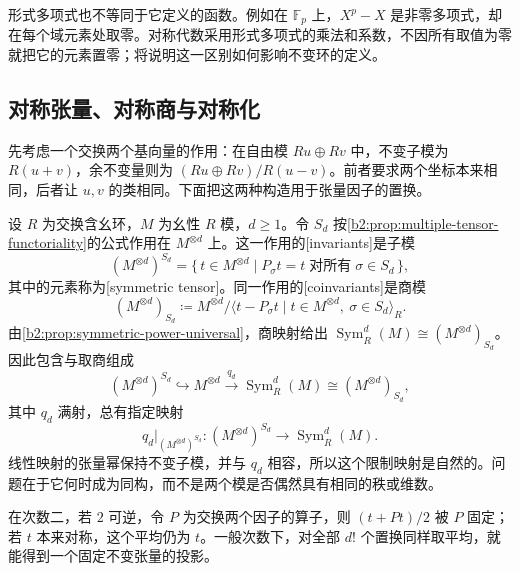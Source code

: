 \ProseParagraphBreak
形式多项式也不等同于它定义的函数。例如在 \(\mathbb F_p\) 上，\(X^p-X\) 是非零多项式，却在每个域元素处取零。对称代数采用形式多项式的乘法和系数，不因所有取值为零就把它的元素置零；将说明这一区别如何影响不变环的定义。

\subsection{对称张量、对称商与对称化}
\label{b2:subsec:0803:03}

先考虑一个交换两个基向量的作用：在自由模 \(Ru\oplus Rv\) 中，不变子模为 \(R(u+v)\)，余不变量则为 \((Ru\oplus Rv)/R(u-v)\)。前者要求两个坐标本来相同，后者让 \(u,v\) 的类相同。下面把这两种构造用于张量因子的置换。

\ProseParagraphBreak
设 \(R\) 为交换含幺环，\(M\) 为幺性 \(R\) 模，\(d\ge1\)。令 \(S_d\) 按\cref{b2:prop:multiple-tensor-functoriality}的公式作用在 \(M^{\otimes d}\) 上。这一作用的[invariants]是子模
\[
	(M^{\otimes d})^{S_d} =\{\,t\in M^{\otimes d}\mid P_\sigma t=t\;\text{对所有}\;\sigma\in S_d\,\},
\]
其中的元素称为[symmetric tensor]。同一作用的[coinvariants]是商模
\[
	(M^{\otimes d})_{S_d} \coloneqq M^{\otimes d}/\langle t-P_\sigma t\mid t\in M^{\otimes d},\ \sigma\in S_d\rangle_R.
\]
由\cref{b2:prop:symmetric-power-universal}，商映射给出 \(\operatorname{Sym}_R^d(M)\cong(M^{\otimes d})_{S_d}\)。因此包含与取商组成
\[
	(M^{\otimes d})^{S_d}\hookrightarrow M^{\otimes d} \xrightarrow{q_d}\operatorname{Sym}_R^d(M) \cong(M^{\otimes d})_{S_d},
\]
其中 \(q_d\) 满射，总有指定映射
\[
	q_d\big|_{(M^{\otimes d})^{S_d}}: (M^{\otimes d})^{S_d}\longrightarrow\operatorname{Sym}_R^d(M).
\]
线性映射的张量幂保持不变子模，并与 \(q_d\) 相容，所以这个限制映射是自然的。问题在于它何时成为同构，而不是两个模是否偶然具有相同的秩或维数。

\ProseParagraphBreak
在次数二，若 \(2\) 可逆，令 \(P\) 为交换两个因子的算子，则 \((t+Pt)/2\) 被 \(P\) 固定；若 \(t\) 本来对称，这个平均仍为 \(t\)。一般次数下，对全部 \(d!\) 个置换同样取平均，就能得到一个固定不变张量的投影。

